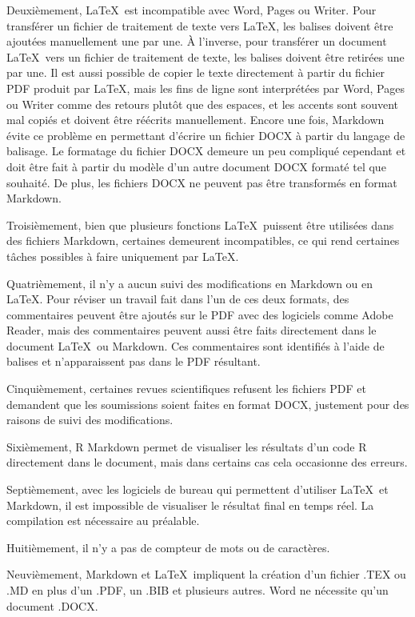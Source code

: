 \documentclass[
  letterpaper,
]{scrbook}
\begin{document}
Deuxièmement, \LaTeX~est incompatible avec Word, Pages ou Writer. Pour
transférer un fichier de traitement de texte vers \LaTeX, les balises
doivent être ajoutées manuellement une par une. À l'inverse, pour
transférer un document \LaTeX~vers un fichier de traitement de texte,
les balises doivent être retirées une par une. Il est aussi possible de
copier le texte directement à partir du fichier PDF produit par \LaTeX,
mais les fins de ligne sont interprétées par Word, Pages ou Writer comme
des retours plutôt que des espaces, et les accents sont souvent mal
copiés et doivent être réécrits manuellement. Encore une fois, Markdown
évite ce problème en permettant d'écrire un fichier DOCX à partir du
langage de balisage. Le formatage du fichier DOCX demeure un peu
compliqué cependant et doit être fait à partir du modèle d'un autre
document DOCX formaté tel que souhaité. De plus, les fichiers DOCX ne
peuvent pas être transformés en format Markdown.

Troisièmement, bien que plusieurs fonctions \LaTeX~puissent être
utilisées dans des fichiers Markdown, certaines demeurent incompatibles,
ce qui rend certaines tâches possibles à faire uniquement par \LaTeX.

Quatrièmement, il n'y a aucun suivi des modifications en Markdown ou en
\LaTeX. Pour réviser un travail fait dans l'un de ces deux formats, des
commentaires peuvent être ajoutés sur le PDF avec des logiciels comme
Adobe Reader, mais des commentaires peuvent aussi être faits directement
dans le document \LaTeX~ou Markdown. Ces commentaires sont identifiés à
l'aide de balises et n'apparaissent pas dans le PDF résultant.

Cinquièmement, certaines revues scientifiques refusent les fichiers PDF
et demandent que les soumissions soient faites en format DOCX, justement
pour des raisons de suivi des modifications.

Sixièmement, R Markdown permet de visualiser les résultats d'un code R
directement dans le document, mais dans certains cas cela occasionne des
erreurs.

Septièmement, avec les logiciels de bureau qui permettent d'utiliser
\LaTeX~et Markdown, il est impossible de visualiser le résultat final en
temps réel. La compilation est nécessaire au préalable.

Huitièmement, il n'y a pas de compteur de mots ou de caractères.

Neuvièmement, Markdown et \LaTeX~impliquent la création d'un fichier
.TEX ou .MD en plus d'un .PDF, un .BIB et plusieurs autres. Word ne
nécessite qu'un document .DOCX.
\end{document}
